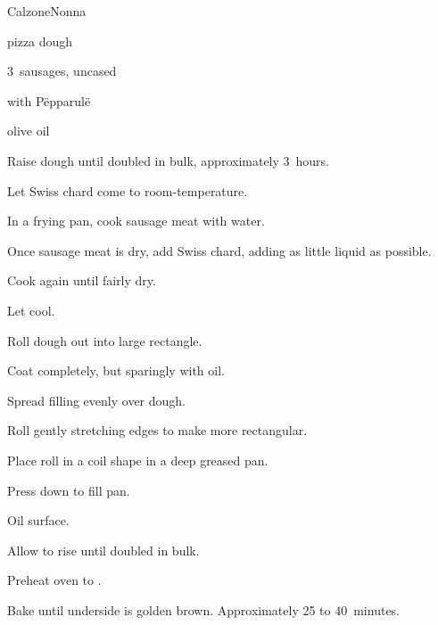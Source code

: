 \begin{recipe}{Calzone}{Nonna}{}

\begin{ingredients}
\item pizza dough
\item 3~sausages, uncased
\item {} with P\"epparul\"e
\item olive oil
\end{ingredients}

\begin{directions}
\item Raise dough until doubled in bulk, approximately 3~hours.
\item Let Swiss chard come to room-temperature.
\item In a frying pan, cook sausage meat with \C{\quarter} water.
\item Once sausage meat is dry, add Swiss chard, adding as little liquid as possible.
\item Cook again until fairly dry.
\item Let cool.
\item Roll dough out into large rectangle.
\item Coat completely, but sparingly with oil.
\item Spread filling evenly over dough.
\item Roll gently stretching edges to make more rectangular.
\item Place roll in a coil shape in a deep greased pan.
\item Press down to fill pan.
\item Oil surface.
\item Allow to rise until doubled in bulk.
\item Preheat oven to .
\item Bake until underside is golden brown. Approximately 25 to 40~minutes.
\end{directions}

\end{recipe}
